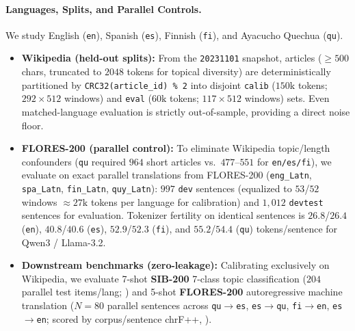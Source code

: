 \documentclass[11pt,a4paper,twocolumn]{article}
\begin{document}
\paragraph{Languages, Splits, and Parallel Controls.}
We study English (\texttt{en}), Spanish (\texttt{es}), Finnish (\texttt{fi}), and Ayacucho Quechua (\texttt{qu}).
\begin{itemize}
  \item \textbf{Wikipedia (held-out splits):} From the \texttt{20231101} snapshot, articles ($\ge 500$ chars, truncated to $2048$ tokens for topical diversity) are deterministically partitioned by \texttt{CRC32(article\_id) \% 2} into disjoint \texttt{calib} ($150\text{k}$ tokens; $292\times 512$ windows) and \texttt{eval} ($60\text{k}$ tokens; $117\times 512$ windows) sets. Even matched-language evaluation is strictly out-of-sample, providing a direct noise floor.
  \item \textbf{FLORES-200 (parallel control):} To eliminate Wikipedia topic/length confounders (\texttt{qu} required $964$ short articles vs.\ $477$--$551$ for \texttt{en/es/fi}), we evaluate on exact parallel translations from FLORES-200 \citep{nllb2022flores} (\texttt{eng\_Latn}, \texttt{spa\_Latn}, \texttt{fin\_Latn}, \texttt{quy\_Latn}): $997$ \texttt{dev} sentences (equalized to $53$/$52$ windows $\approx 27\text{k}$ tokens per language for calibration) and $1{,}012$ \texttt{devtest} sentences for evaluation. Tokenizer fertility on identical sentences is $26.8$/$26.4$ (\texttt{en}), $40.8$/$40.6$ (\texttt{es}), $52.9$/$52.3$ (\texttt{fi}), and $55.2$/$54.4$ (\texttt{qu}) tokens/sentence for Qwen3 / Llama-3.2.
  \item \textbf{Downstream benchmarks (zero-leakage):} Calibrating exclusively on Wikipedia, we evaluate 7-shot \textbf{SIB-200} 7-class topic classification ($204$ parallel test items/lang; \citealp{adelani2024sib200}) and 5-shot \textbf{FLORES-200} autoregressive machine translation ($N=80$ parallel sentences across \texttt{qu}$\rightarrow$\texttt{es}, \texttt{es}$\rightarrow$\texttt{qu}, \texttt{fi}$\rightarrow$\texttt{en}, \texttt{es}$\rightarrow$\texttt{en}; scored by corpus/sentence chrF++, \citealp{popovic2017chrf}).
\end{itemize}
\end{document}
